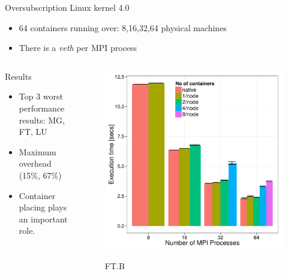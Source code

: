 \documentclass[presentation]{beamer}
\begin{document}
\begin{frame}[label=sec-3-4]{Oversubscription Linux kernel 4.0}
\begin{itemize}
\item 64 containers running over: 8,16,32,64 physical machines
\item There is a \textit{veth} per MPI process
\end{itemize}
\begin{columns}
\begin{column}{0.5\textwidth}
\begin{block}{Results}

\begin{itemize}
\item Top 3 worst performance results: MG, FT, LU
\item Maximum overhead (15\%, 67\%)
\item Container placing plays an important role.
\end{itemize}
\end{block}
\end{column}


\begin{column}{0.5\textwidth}


\begin{figure}[!h]
  \center
  \includegraphics[scale=0.30]{figures/execution_time-tso-40.pdf}
  \label{fig:hpc}
  \caption{FT.B}
\end{figure}
\end{column}
\end{columns}
\end{frame}
\end{document}
